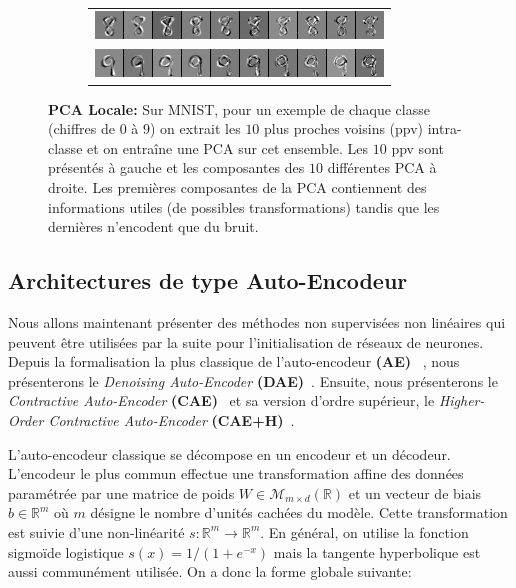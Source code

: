 \begin{figure}
\begin{subfigure}{0.45\textwidth}
\begin{tabular}{c}
  \includegraphics[width=0.90\linewidth]{predoc/images/8_eigenvectors.png}\\
  \includegraphics[width=0.90\linewidth]{predoc/images/9_eigenvectors.png}
\end{tabular}
\end{subfigure}

   \caption[Vecteurs propres d'une PCA sur les 10-ppv de classes de MNIST]{{\bf PCA Locale:} Sur MNIST, pour un exemple de chaque classe (chiffres de $0$ à $9$) on
   extrait les $10$ plus proches voisins (ppv) intra-classe et on entraîne une PCA sur cet
   ensemble. Les $10$ ppv sont présentés à gauche et les
   composantes des $10$ différentes PCA à droite. Les premières composantes de
   la PCA contiennent des informations utiles (de possibles transformations)
   tandis que les dernières n'encodent que du bruit.}

\label{fig:mnistpca}
\end{figure}

\subsection{Architectures de type Auto-Encodeur}

Nous allons maintenant présenter des méthodes non supervisées non linéaires qui peuvent être utilisées par la suite pour
l'initialisation de réseaux de neurones.
Depuis la formalisation la plus classique de l'auto-encodeur
\textbf{(AE)}~\citep{Gallinari87} , nous présenterons le \textit{Denoising
Auto-Encoder} \textbf{(DAE)}~\citep{VincentPLarochelleH2008,Vincent-JMLR-2010}.
Ensuite, nous présenterons le \textit{Contractive Auto-Encoder}
\textbf{(CAE)}~\citep{Rifai+al-2011} et sa version d'ordre supérieur,
le \textit{Higher-Order Contractive Auto-Encoder}
\textbf{(CAE+H)}~\citep{Salah+al-2011}.

L'auto-encodeur classique se décompose en un encodeur et un décodeur.
L'encodeur le plus commun effectue une transformation affine des données paramétrée par une
matrice de poids $W\in\mathcal{M}_{m\times d}(\mathbb{R})$ et un vecteur de biais $b\in\mathbb{R}^m$ où $m$ désigne le
nombre d'unités cachées du modèle.
Cette transformation est suivie d'une non-linéarité $s:\mathbb{R}^m \rightarrow
\mathbb{R}^m$. En général, on utilise la
fonction sigmoïde logistique $s(x)=1/(1+e^{-x})$ mais la tangente hyperbolique est aussi
communément utilisée. On a donc la forme globale suivante:

